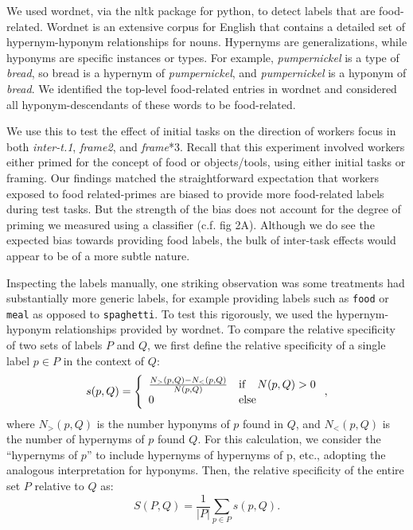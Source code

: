 \documentclass[12pt]{article}
\begin{document}
We used wordnet, via the nltk package for python, to detect labels that are 
food-related.  Wordnet is an extensive corpus for English that contains a 
detailed set of hypernym-hyponym relationships for nouns.  Hypernyms are 
generalizations, while hyponyms are specific instances or types.  For example,
\textit{pumpernickel} is a type of \textit{bread}, so bread is a hypernym of 
\textit{pumpernickel}, and \textit{pumpernickel} is a hyponym of 
\textit{bread}.  We identified the top-level food-related entries in wordnet 
and considered all hyponym-descendants of these words to be food-related.

We use this to test the effect of initial tasks on the direction of workers
focus in both \textit{inter-t.1}, \textit{frame2}, and \textit{frame}*3.  
Recall that this experiment involved
workers either primed for the concept of food or objects/tools, using either
initial tasks or framing.  Our findings matched the straightforward
expectation that workers exposed to food related-primes are biased to 
provide more food-related labels during test tasks.  But the strength of
the bias does not account for the degree of priming we measured using a 
classifier (c.f. fig 2A).  Although we do see the expected
bias towards providing food labels, the bulk of inter-task effects would appear
to be of a more subtle nature. 

Inspecting the labels manually, one striking observation was some treatments
had substantially more generic labels, for example providing labels such as
\texttt{food} or \texttt{meal} as opposed to \texttt{spaghetti}.  To test this
rigorously, we used the hypernym-hyponym relationships provided by wordnet.  
To compare the relative specificity of two sets of labels $P$ and $Q$, we first
define the relative specificity of a single label $p \in P$ in the context of
$Q$:
$$
s(p,Q) = \left\{
	\begin{array}{l l}
		\frac{N_>(p,Q) - N_<(p,Q)}{N(p,Q)} &\mathrm{if}\quad N(p,Q) > 0\\
		0 &\mathrm{else}
	\end{array}
	\right.,
$$
where $N_>(p,Q)$ is the number hyponyms of $p$ found in $Q$, and $N_<(p,Q)$ is
the number of hypernyms of $p$ found $Q$.  For this calculation, we consider 
the ``hypernyms of $p$'' to include hypernyms of hypernyms of p, etc., 
adopting the analogous interpretation for hyponyms.  Then, the relative
specificity of the entire set $P$ relative to $Q$ as:
$$
	S(P,Q) = \frac{1}{|P|}\sum_{p \in P} s(p,Q).
$$
\end{document}

